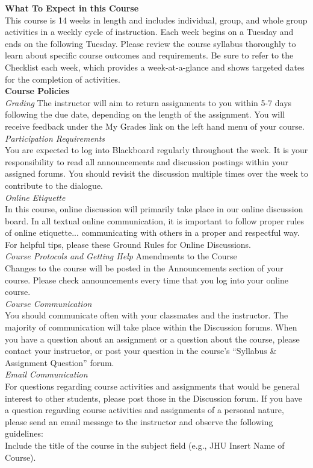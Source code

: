 \documentclass[11pt]{article}
\begin{document}
\textbf{What To Expect in this Course} \\
This course is 14 weeks in length and includes individual, group, and whole group activities in a weekly cycle of instruction. Each week begins on a Tuesday and ends on the following Tuesday. Please review the course syllabus thoroughly to learn about specific course outcomes and requirements. Be sure to refer to the Checklist each week, which provides a week-at-a-glance and shows targeted dates for the completion of activities. \\
\textbf{Course Policies} \\
\emph{Grading} The instructor will aim to return assignments to you within 5-7 days following the due date, depending on the length of the assignment. You will receive feedback under the My Grades link on the left hand menu of your course.\\
\emph{Participation Requirements} \\
You are expected to log into Blackboard regularly throughout the week. It is your responsibility to read all announcements and discussion postings within your assigned forums. You should revisit the discussion multiple times over the week to contribute to the dialogue. \\
\emph{Online Etiquette} \\
In this course, online discussion will primarily take place in our online discussion board.  In all textual online communication, it is important to follow proper rules of online etiquette... communicating with others in a proper and respectful way. For helpful tips, please these Ground Rules for Online Discussions. \\
\emph{Course Protocols and Getting Help}
Amendments to the Course \\
Changes to the course will be posted in the Announcements section of your course. Please check announcements every time that you log into your online course. \\
\emph{Course Communication} \\
You should communicate often with your classmates and the instructor. The majority of communication will take place within the Discussion forums. When you have a question about an assignment or a question about the course, please contact your instructor, or post your question in the course’s “Syllabus \& Assignment Question” forum. \\
\emph{Email Communication} \\
For questions regarding course activities and assignments that would be general interest to other students, please post those in the Discussion forum.  If you have a question regarding course activities and assignments of a personal nature, please send an email message to the instructor and observe the following guidelines: \\
Include the title of the course in the subject field (e.g., JHU Insert Name of Course). \\
\end{document}
